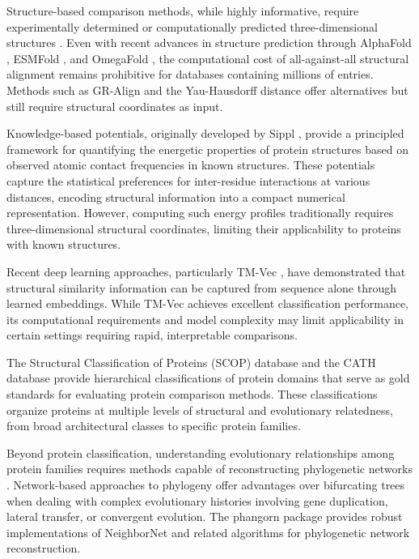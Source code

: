 \documentclass[11pt]{article}
\begin{document}
Structure-based comparison methods, while highly informative, require experimentally determined or computationally predicted three-dimensional structures \citep{jumper2021}. Even with recent advances in structure prediction through AlphaFold \citep{jumper2021}, ESMFold \citep{lin2023}, and OmegaFold \citep{wu2022}, the computational cost of all-against-all structural alignment remains prohibitive for databases containing millions of entries. Methods such as GR-Align \citep{malod2014} and the Yau-Hausdorff distance \citep{yau2004} offer alternatives but still require structural coordinates as input.

Knowledge-based potentials, originally developed by Sippl \citep{sippl1990}, provide a principled framework for quantifying the energetic properties of protein structures based on observed atomic contact frequencies in known structures. These potentials capture the statistical preferences for inter-residue interactions at various distances, encoding structural information into a compact numerical representation. However, computing such energy profiles traditionally requires three-dimensional structural coordinates, limiting their applicability to proteins with known structures.

Recent deep learning approaches, particularly TM-Vec \citep{heinzinger2023}, have demonstrated that structural similarity information can be captured from sequence alone through learned embeddings. While TM-Vec achieves excellent classification performance, its computational requirements and model complexity may limit applicability in certain settings requiring rapid, interpretable comparisons.

The Structural Classification of Proteins (SCOP) database \citep{murzin1995, fox2014} and the CATH database \citep{sillitoe2019} provide hierarchical classifications of protein domains that serve as gold standards for evaluating protein comparison methods. These classifications organize proteins at multiple levels of structural and evolutionary relatedness, from broad architectural classes to specific protein families.

Beyond protein classification, understanding evolutionary relationships among protein families requires methods capable of reconstructing phylogenetic networks \citep{huson2006, bryant2004}. Network-based approaches to phylogeny offer advantages over bifurcating trees when dealing with complex evolutionary histories involving gene duplication, lateral transfer, or convergent evolution. The phangorn package \citep{schliep2011} provides robust implementations of NeighborNet and related algorithms for phylogenetic network reconstruction.
\end{document}
